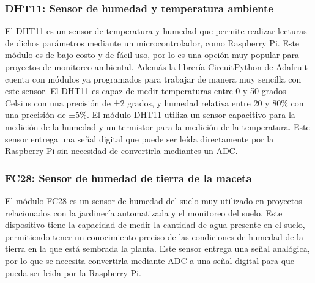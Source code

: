         \subsubsection{DHT11: Sensor de humedad y temperatura ambiente}
        El DHT11 \cite{wiki:dht11} es un sensor de temperatura y humedad que permite realizar lecturas de dichos parámetros mediante un microcontrolador, como Raspberry Pi. Este módulo es de bajo costo y de fácil uso, por lo es  una opción muy popular para proyectos de monitoreo ambiental. Además la librería CircuitPython de Adafruit \cite{doc:mcp3008} cuenta con módulos ya programados para trabajar de manera muy sencilla con este sensor.
        El DHT11 es capaz de medir temperaturas entre 0 y 50 grados Celsius con una precisión de ±2 grados, y humedad relativa entre 20 y 80\% con una precisión de ±5\%.
        El módulo DHT11 utiliza un sensor capacitivo para la medición de la humedad y un termistor para la medición de la temperatura. Este sensor entrega una señal digital que puede ser leída directamente por la Raspberry Pi sin necesidad de convertirla mediantes un ADC.
        \subsubsection{FC28: Sensor de humedad de tierra de la maceta}
        El módulo FC28 es un sensor de humedad del suelo muy utilizado en proyectos relacionados con la jardinería automatizada y el monitoreo del suelo. Este dispositivo tiene la capacidad de medir la cantidad de agua presente en el suelo, permitiendo tener un conocimiento preciso de las condiciones de humedad de la tierra en la que está sembrada la planta. Este sensor entrega una señal analógica, por lo que se necesita convertirla mediante ADC a una señal digital para que pueda ser leida por la Raspberry Pi.
